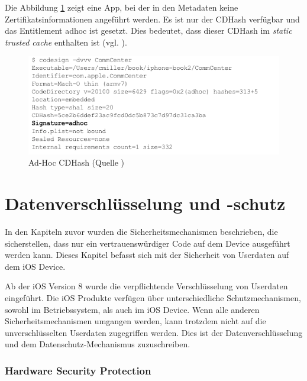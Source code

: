 Die Abbildung \ref{fig:Ad-Hoc CDHash} zeigt eine App, bei der in den Metadaten  keine Zertifikatsinformationen angeführt werden. Es ist nur der CDHash verfügbar und das Entitlement adhoc ist gesetzt. Dies bedeutet, dass dieser CDHash im \textit{\glqq static trusted cache\grqq{}} enthalten ist (vgl. \cite{Sign[1], Sign[2], Sign[3], Sign[4], Sign[5]}).

\begin{figure}[!ht]
        \centering
        \includegraphics[scale=0.9]{ADhoc_CDHash.png}
        \caption{Ad-Hoc CDHash (Quelle \cite{Hacking[1]})}
        \label{fig:Ad-Hoc CDHash}
\end{figure}
\newpage
\section{Datenverschlüsselung und -schutz}
\label{sec:EncryptionandDataProtection}

In den Kapiteln zuvor wurden die Sicherheitsmechanismen beschrieben, die sicherstellen, dass nur ein vertrauenswürdiger Code auf dem Device ausgeführt werden kann. Dieses Kapitel befasst sich mit der Sicherheit von Userdaten auf dem iOS Device. 

Ab der iOS Version 8 wurde die verpflichtende Verschlüsselung von Userdaten eingeführt. Die iOS Produkte verfügen über unterschiedliche Schutzmechanismen, sowohl im Betriebssystem, als auch im iOS Device. Wenn alle anderen Sicherheitsmechanismen umgangen werden, kann trotzdem nicht auf die unverschlüsselten Userdaten zugegriffen werden. Dies ist der Datenverschlüsselung und dem Datenschutz-Mechanismus zuzuschreiben.

\subsubsection{Hardware Security Protection}
\label{sec:HardwareSecProtection}

